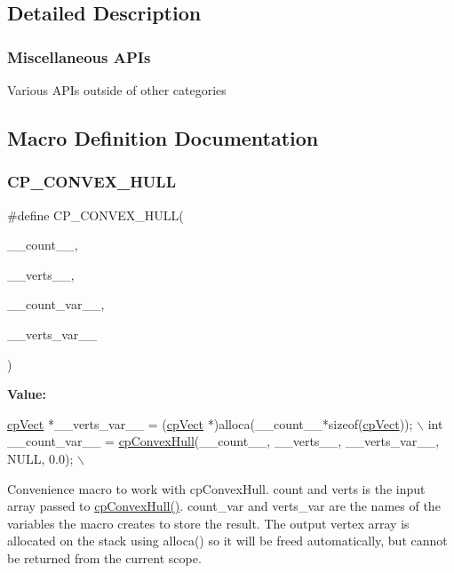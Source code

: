 \subsection{Detailed Description}
\subsubsection*{Miscellaneous A\+P\+Is}

Various A\+P\+Is outside of other categories 

\subsection{Macro Definition Documentation}
\mbox{\label{group__misc_ga9abe29a1fe6d1f2041e95f2fb2e2ce1c}} 
\subsubsection{\texorpdfstring{C\+P\+\_\+\+C\+O\+N\+V\+E\+X\+\_\+\+H\+U\+LL}{CP\_CONVEX\_HULL}\hspace{0.1cm}{\footnotesize\ttfamily [1/2]}}
{\footnotesize\ttfamily \#define C\+P\+\_\+\+C\+O\+N\+V\+E\+X\+\_\+\+H\+U\+LL(\begin{DoxyParamCaption}\item[{}]{\+\_\+\+\_\+count\+\_\+\+\_\+,  }\item[{}]{\+\_\+\+\_\+verts\+\_\+\+\_\+,  }\item[{}]{\+\_\+\+\_\+count\+\_\+var\+\_\+\+\_\+,  }\item[{}]{\+\_\+\+\_\+verts\+\_\+var\+\_\+\+\_\+ }\end{DoxyParamCaption})}

{\bfseries Value\+:}
\begin{DoxyCode}
\hyperlink{structcpVect}{cpVect} *\_\_verts\_var\_\_ = (\hyperlink{structcpVect}{cpVect} *)alloca(\_\_count\_\_*\textcolor{keyword}{sizeof}(\hyperlink{structcpVect}{cpVect})); \(\backslash\)
int \_\_count\_var\_\_ = \hyperlink{group__misc_ga94ed1fc4d2c987c3e4df3cb16b12a156}{cpConvexHull}(\_\_count\_\_, \_\_verts\_\_, \_\_verts\_var\_\_, NULL, 0.0); \(\backslash\)
\end{DoxyCode}
Convenience macro to work with cp\+Convex\+Hull. {\ttfamily count} and {\ttfamily verts} is the input array passed to \hyperlink{group__misc_ga94ed1fc4d2c987c3e4df3cb16b12a156}{cp\+Convex\+Hull()}. {\ttfamily count\+\_\+var} and {\ttfamily verts\+\_\+var} are the names of the variables the macro creates to store the result. The output vertex array is allocated on the stack using alloca() so it will be freed automatically, but cannot be returned from the current scope. \mbox{\label{group__misc_ga9abe29a1fe6d1f2041e95f2fb2e2ce1c}} 
